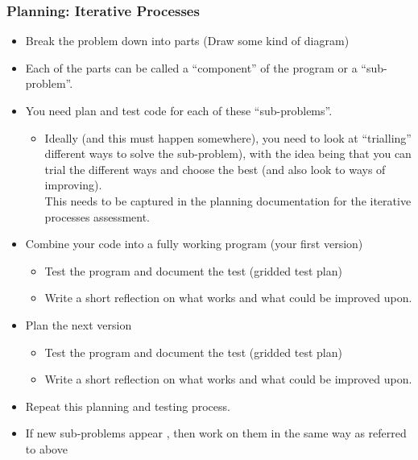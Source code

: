 \documentclass[a4paper,12pt]{article}
\begin{document}
\subsubsection{Planning: Iterative Processes}
\begin{itemize}
	\item Break the problem down into parts (Draw some kind of diagram)
	\item Each of the parts can be called a ``component'' of the program or a ``sub-problem''.
	\item You need plan and test code for each of these ``sub-problems''.
	\begin{itemize}
		\item Ideally (and this must happen somewhere), you need to look at ``trialling'' different ways to solve the sub-problem), with the idea being that you can trial the different ways and choose the best (and also look to ways of improving). \\
		This needs to be captured in the planning documentation for the iterative processes assessment.
	\end{itemize}
	\item Combine your code into a fully working program (your first version)
	\begin{itemize}
		\item Test the program and document the test (gridded test plan)
		\item Write a short reflection on what works and what could be improved upon.
	\end{itemize}
\item Plan the next version 
\begin{itemize}
	\item Test the program and document the test (gridded test plan)
	\item Write a short reflection on what works and what could be improved upon.
\end{itemize}
\item Repeat this planning and testing process.
\item If new sub-problems appear , then work on them in the same way as referred to above
\end{itemize}
\newpage
\end{document}

